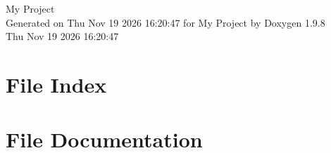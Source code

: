 \documentclass[twoside]{book}
\newcommand{\+}{\discretionary{\mbox{\scriptsize$\hookleftarrow$}}{}{}}
\newcommand{\clearemptydoublepage}{%
    \newpage{\pagestyle{empty}\cleardoublepage}%
  }
\begin{document}
  \raggedbottom
    \hypersetup{pageanchor=false,
                bookmarksnumbered=true,
                pdfencoding=unicode
               }
  \begin{titlepage}
  \vspace*{7cm}
  \begin{center}%
  {\Large My Project}\\
  \vspace*{1cm}
  {\large Generated on Thu Nov 19 2026 16\+:20\+:47 for My Project by Doxygen 1.9.8}\\
    \vspace*{0.5cm}
    {\small Thu Nov 19 2026 16:20:47}
  \end{center}
  \end{titlepage}
  \clearemptydoublepage
  \tableofcontents
  \clearemptydoublepage
  \hypersetup{pageanchor=true}

\chapter{File Index}

\chapter{File Documentation}


  \backmatter
  \newpage
  \clearemptydoublepage
  \printindex
\end{document}
